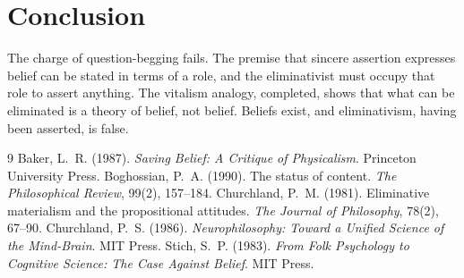 \documentclass{situationist-preprint}
\begin{document}
\section{Conclusion}

The charge of question-begging fails. The premise that sincere assertion expresses belief can be stated in terms of a role, and the eliminativist must occupy that role to assert anything. The vitalism analogy, completed, shows that what can be eliminated is a theory of belief, not belief. Beliefs exist, and eliminativism, having been asserted, is false.

\begin{thebibliography}{9}\small
{} Baker, L.~R. (1987). \emph{Saving Belief: A Critique of Physicalism}. Princeton University Press.
 Boghossian, P.~A. (1990). The status of content. \emph{The Philosophical Review}, 99(2), 157--184.
 Churchland, P.~M. (1981). Eliminative materialism and the propositional attitudes. \emph{The Journal of Philosophy}, 78(2), 67--90.
 Churchland, P.~S. (1986). \emph{Neurophilosophy: Toward a Unified Science of the Mind-Brain}. MIT Press.
 Stich, S.~P. (1983). \emph{From Folk Psychology to Cognitive Science: The Case Against Belief}. MIT Press.
\end{thebibliography}
\end{document}
